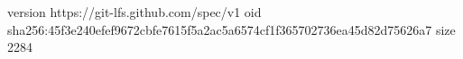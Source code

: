version https://git-lfs.github.com/spec/v1
oid sha256:45f3e240efef9672cbfe7615f5a2ac5a6574cf1f365702736ea45d82d75626a7
size 2284
